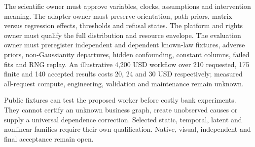 The scientific owner must approve variables, clocks, assumptions and
intervention meaning. The adapter owner must preserve orientation, path
priors, matrix versus regression effects, thresholds and refusal states.
The platform and rights owner must qualify the full distribution and
resource envelope. The evaluation owner must preregister independent and
dependent known-law fixtures, adverse priors, non-Gaussianity departures,
hidden confounding, constant columns, failed fits and RNG replay.
An illustrative 4,200 USD workflow over 210 requested, 175 finite and
140 accepted results costs 20, 24 and 30 USD respectively; measured
all-request compute, engineering, validation and maintenance remain unknown.
\citep{exec24_lingam_choice}

Public fixtures can test the proposed worker before costly bank experiments.
They cannot certify an unknown business graph, create unobserved causes
or supply a universal dependence correction. Selected static, temporal,
latent and nonlinear families require their own qualification. Native,
visual, independent and final acceptance remain open.
\citep{exec24_lingam_choice}

